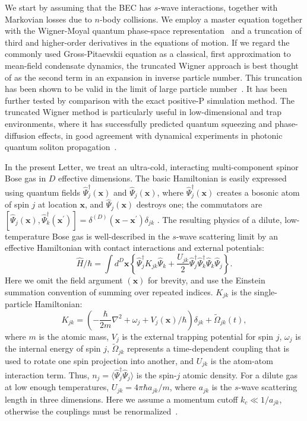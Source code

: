 \documentclass[aps,prl,twocolumn,showpacs,amsmath,amssymb,superscriptaddress,flushbottom,noraggedfooter]{revtex4-1}
\newcommand{\xvec}{\boldsymbol{x}}
\begin{document}
We start by assuming that the BEC has $s$-wave interactions,
together with Markovian losses due to $n$-body collisions.
We employ a master equation together with the Wigner-Moyal quantum phase-space representation~\cite{Gardiner2004}
and a truncation of third and higher-order derivatives in the equations of motion.
If we regard the commonly used Gross-Pitaevskii equation as a classical,
first approximation to mean-field condensate dynamics,
the truncated Wigner approach is best thought of as the second term in an expansion in inverse particle number.
This truncation has been shown to be valid in the limit of large particle
number~\cite{Drummond1993,Steel1998,Sinatra2002}.
It has been further tested by comparison with the exact positive-P simulation method.
The truncated Wigner method is particularly useful in low-dimensional and
trap environments, where it has successfully predicted quantum squeezing
and phase-diffusion effects, in good agreement with dynamical experiments
in photonic quantum soliton propagation~\cite{Carter1987,Corney2008}.

In the present Letter, we treat an ultra-cold,
interacting multi-component spinor Bose gas in $D$ effective dimensions.
The basic Hamiltonian is easily expressed using quantum fields
$\widehat{\Psi}_j^{\dagger}(\xvec)$ and $\widehat{\Psi}_j(\xvec)$,
where $\widehat{\Psi}_j^{\dagger}(\xvec)$ creates a bosonic atom of spin $j$
at location $\xvec$, and $\widehat{\Psi}_j(\xvec)$ destroys one;
the commutators are
$[\widehat{\Psi}_j(\xvec),\widehat{\Psi}_k^{\dagger}(\xvec^\prime)] =
\delta^{(D)}(\xvec-\xvec^\prime)\delta_{jk}\,\,.$
The resulting physics of a dilute, low-temperature Bose gas
is well-described in the $s$-wave scattering limit by an effective Hamiltonian
with contact interactions and external potentials:
\begin{equation}
	\hat{H} / \hbar = \int d^{D}\xvec \left\{
		\widehat{\Psi}_j^{\dagger} K_{jk} \widehat{\Psi}_k +
		\frac{U_{jk}}{2} \widehat{\Psi}_j^{\dagger} \widehat{\Psi}_k^{\dagger}
		\widehat{\Psi}_k \widehat{\Psi}_j
	\right\}.
\end{equation}
Here we omit the field argument $(\xvec)$ for brevity,
and use the Einstein summation convention of summing over repeated indices.
$K_{jk}$ is the single-particle Hamiltonian:
\begin{equation}
	K_{jk} = \left( -\frac{\hbar}{2m} \nabla^2 + \omega_j + V_j(\xvec) / \hbar \right) \delta_{jk} +
		\tilde{\Omega}_{jk}(t),
\end{equation}
where $m$ is the atomic mass, $V_j$ is the external trapping potential for spin $j$,
$\omega_j$ is the internal energy of spin $j$,
$\tilde{\Omega}_{jk}$ represents a time-dependent coupling
that is used to rotate one spin projection into another,
and $U_{jk}$ is the atom-atom interaction term.
Thus, $n_j = \langle \widehat{\Psi}_j^{\dagger} \widehat{\Psi}_j \rangle$
is the spin-$j$ atomic density.
For a dilute gas at low enough temperatures,
$U_{jk}=4\pi\hbar a_{jk} / m$, where $a_{jk}$ is the $s$-wave scattering length in three dimensions.
Here we assume a momentum cutoff $k_{c} \ll 1 / a_{jk}$,
otherwise the couplings must be renormalized~\cite{Sinatra2002}.
\end{document}
